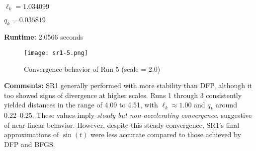 \documentclass{article}
\begin{document}
\vspace{0.5em}
\noindent
$\ell_k = 1.034099$

\noindent
$q_k = 0.035819$

\vspace{0.5em}
\noindent
\textbf{Runtime:} 2.0566 seconds

\begin{figure}[H]
    \centering
    \texttt{[image: sr1-5.png]}
    \caption{Convergence behavior of Run 5 (scale = 2.0)}
\end{figure}

\noindent
\textbf{Comments:} SR1 generally performed with more stability than DFP, although it too showed signs of divergence at higher scales. Runs 1 through 3 consistently yielded distances in the range of 4.09 to 4.51, with $\ell_k \approx 1.00$ and $q_k$ around 0.22–0.25. These values imply \textit{steady but non-accelerating convergence}, suggestive of near-linear behavior. However, despite this steady convergence, SR1's final approximations of $\sin(t)$ were less accurate compared to those achieved by DFP and BFGS.
\end{document}
